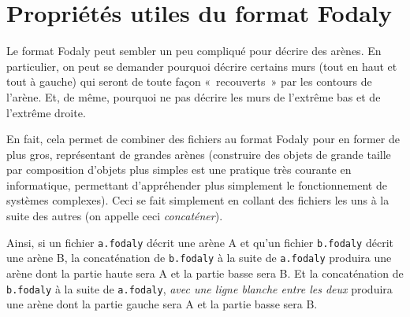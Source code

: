 \documentclass[a4paper]{paper}
\newcommand{\nomFormat}{Fodaly}
\begin{document}
\section{Propriétés utiles du format \nomFormat{}}


Le format \nomFormat{} peut sembler un peu compliqué pour décrire des arènes.
En particulier, on peut se demander pourquoi décrire certains murs (tout en haut et tout à gauche) qui seront de toute façon «~recouverts~» par les contours de l'arène.
Et, de même, pourquoi ne pas décrire les murs de l'extrême bas et de l'extrême droite.

En fait, cela permet de combiner des fichiers au format \nomFormat{} pour en former de plus gros, représentant de grandes arènes (construire des objets de grande taille par composition d'objets plus simples est une pratique très courante en informatique, permettant d'appréhender plus simplement le fonctionnement de systèmes complexes). Ceci se fait simplement en collant des fichiers les uns à la suite des autres (on appelle ceci \emph{concaténer}).

Ainsi, si un fichier \verb|a.fodaly| décrit une arène A et qu'un fichier \verb|b.fodaly| décrit une arène B, la concaténation de \verb|b.fodaly| à la suite de \verb|a.fodaly| produira une arène dont la partie haute sera A et la partie basse sera B.
Et la concaténation de \verb|b.fodaly| à la suite de \verb|a.fodaly|, \emph{avec une ligne blanche entre les deux} produira une arène dont la partie gauche sera A et la partie basse sera B.

\end{document}
